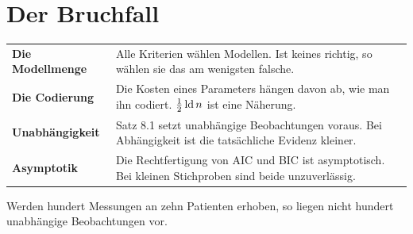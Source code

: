 \section{Der Bruchfall}

\begin{warnung}
\begin{center}
{\small
\renewcommand{\arraystretch}{1.52}
\begin{tabular}{@{}P{2.8cm}P{5.8cm}@{}}
\toprule
\textbf{Die Modellmenge} & Alle Kriterien wählen  Modellen. Ist keines richtig, so wählen sie das am wenigsten falsche.\\
\textbf{Die Codierung} & Die Kosten eines Parameters hängen davon ab, wie man ihn codiert. $\frac12\operatorname{ld} n$ ist eine Näherung.\\
\textbf{Unabhängigkeit} & Satz 8.1 setzt unabhängige Beobachtungen voraus. Bei Abhängigkeit ist die tatsächliche Evidenz kleiner.\\
\textbf{Asymptotik} & Die Rechtfertigung von AIC und BIC ist asymptotisch. Bei kleinen Stichproben sind beide unzuverlässig.\\
\bottomrule
\end{tabular}}
\end{center}

Werden hundert Messungen an zehn Patienten erhoben, so liegen nicht hundert unabhängige Beobachtungen vor.

\begin{center}
\begin{minipage}{0.88\textwidth}
\end{minipage}
\end{center}

\begin{center}
\begin{minipage}{0.88\textwidth}
\end{minipage}
\end{center}
\end{warnung}

